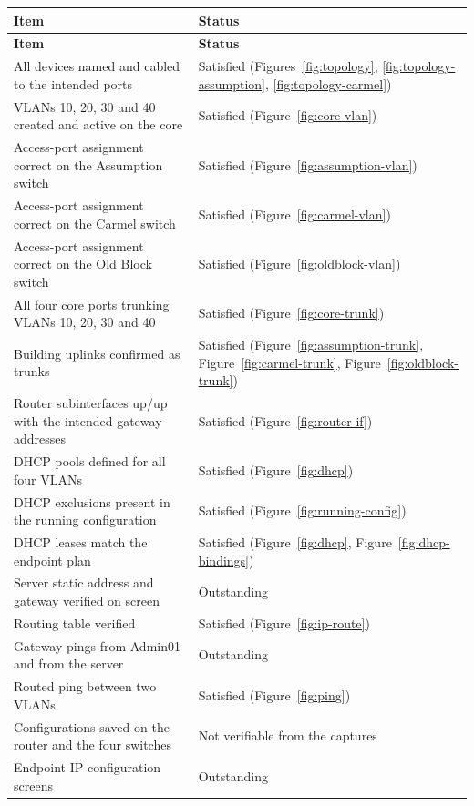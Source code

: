 \documentclass[11pt,a4paper]{article}
\newcommand{\figref}[1]{Figure~\ref{#1}}
\begin{document}
\small
\begin{longtable}{@{}L{0.72\textwidth} L{0.20\textwidth}@{}}
\toprule
\textbf{Item} & \textbf{Status} \\
\midrule
\endfirsthead
\toprule
\textbf{Item} & \textbf{Status} \\
\midrule
\endhead
All devices named and cabled to the intended ports & Satisfied (Figures~\ref{fig:topology}, \ref{fig:topology-assumption}, \ref{fig:topology-carmel}) \\
VLANs 10, 20, 30 and 40 created and active on the core & Satisfied (\figref{fig:core-vlan}) \\
Access-port assignment correct on the Assumption switch & Satisfied (\figref{fig:assumption-vlan}) \\
Access-port assignment correct on the Carmel switch & Satisfied (\figref{fig:carmel-vlan}) \\
Access-port assignment correct on the Old Block switch & Satisfied (\figref{fig:oldblock-vlan}) \\
All four core ports trunking VLANs 10, 20, 30 and 40 & Satisfied (\figref{fig:core-trunk}) \\
Building uplinks confirmed as trunks & Satisfied (\figref{fig:assumption-trunk}, \figref{fig:carmel-trunk}, \figref{fig:oldblock-trunk}) \\
Router subinterfaces up/up with the intended gateway addresses & Satisfied (\figref{fig:router-if}) \\
DHCP pools defined for all four VLANs & Satisfied (\figref{fig:dhcp}) \\
DHCP exclusions present in the running configuration & Satisfied (\figref{fig:running-config}) \\
DHCP leases match the endpoint plan & Satisfied (\figref{fig:dhcp}, \figref{fig:dhcp-bindings}) \\
Server static address and gateway verified on screen & Outstanding \\
Routing table verified & Satisfied (\figref{fig:ip-route}) \\
Gateway pings from Admin01 and from the server & Outstanding \\
Routed ping between two VLANs & Satisfied (\figref{fig:ping}) \\
Configurations saved on the router and the four switches & Not verifiable from the captures \\
Endpoint IP configuration screens & Outstanding \\
\bottomrule
\end{longtable}
\end{document}
